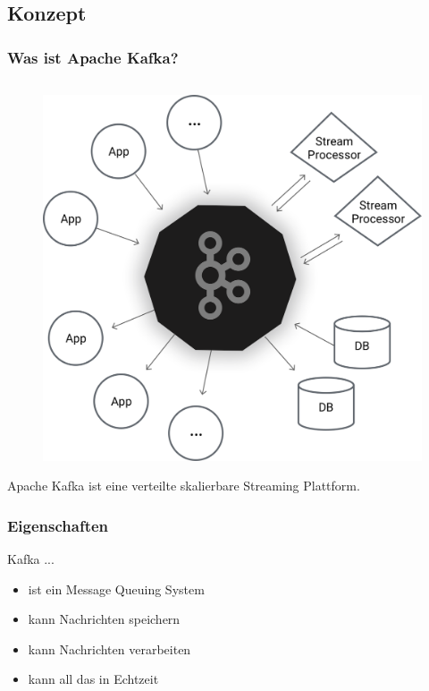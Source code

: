 \begin{frame}
\section{Konzept}
\frametitle{Was ist Apache Kafka?}
\begin{columns}[T]
	\begin{column}[T]{0.49\textwidth}
		
	\end{column}
	\begin{column}[T]{0.49\textwidth}
		
\end{column}
\end{columns}

\centering
\begin{figure}[h]
	\includegraphics[scale=0.1]{figure/kafka_diagram.png}
\end{figure}

Apache Kafka ist eine verteilte skalierbare Streaming Plattform.
\end{frame}


\begin{frame}
\frametitle{Eigenschaften}
Kafka ...
\begin{itemize}
	\item ist ein Message Queuing System
	\item kann Nachrichten speichern
	\item kann Nachrichten verarbeiten
	\item kann all das in Echtzeit
\end{itemize}
\end{frame}

